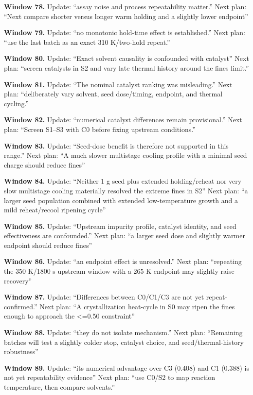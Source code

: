 \documentclass[10pt,a4paper]{article}
\begin{document}
\textbf{Window 78.} Update: ``assay noise and process repeatability matter.'' Next plan: ``Next compare shorter versus longer warm holding and a slightly lower endpoint''

\textbf{Window 79.} Update: ``no monotonic hold-time effect is established.'' Next plan: ``use the last batch as an exact 310 K/two-hold repeat.''

\textbf{Window 80.} Update: ``Exact solvent causality is confounded with catalyst'' Next plan: ``screen catalysts in S2 and vary late thermal history around the fines limit.''

\textbf{Window 81.} Update: ``The nominal catalyst ranking was misleading.'' Next plan: ``deliberately vary solvent, seed dose/timing, endpoint, and thermal cycling.''

\textbf{Window 82.} Update: ``numerical catalyst differences remain provisional.'' Next plan: ``Screen S1--S3 with C0 before fixing upstream conditions.''

\textbf{Window 83.} Update: ``Seed-dose benefit is therefore not supported in this range.'' Next plan: ``A much slower multistage cooling profile with a minimal seed charge should reduce fines''

\textbf{Window 84.} Update: ``Neither 1 g seed plus extended holding/reheat nor very slow multistage cooling materially resolved the extreme fines in S2'' Next plan: ``a larger seed population combined with extended low-temperature growth and a mild reheat/recool ripening cycle''

\textbf{Window 85.} Update: ``Upstream impurity profile, catalyst identity, and seed effectiveness are confounded.'' Next plan: ``a larger seed dose and slightly warmer endpoint should reduce fines''

\textbf{Window 86.} Update: ``an endpoint effect is unresolved.'' Next plan: ``repeating the 350 K/1800 s upstream window with a 265 K endpoint may slightly raise recovery''

\textbf{Window 87.} Update: ``Differences between C0/C1/C3 are not yet repeat-confirmed.'' Next plan: ``A crystallization heat-cycle in S0 may ripen the fines enough to approach the \textless=0.50 constraint''

\textbf{Window 88.} Update: ``they do not isolate mechanism.'' Next plan: ``Remaining batches will test a slightly colder stop, catalyst choice, and seed/thermal-history robustness''

\textbf{Window 89.} Update: ``its numerical advantage over C3 (0.408) and C1 (0.388) is not yet repeatability evidence'' Next plan: ``use C0/S2 to map reaction temperature, then compare solvents.''
\end{document}
